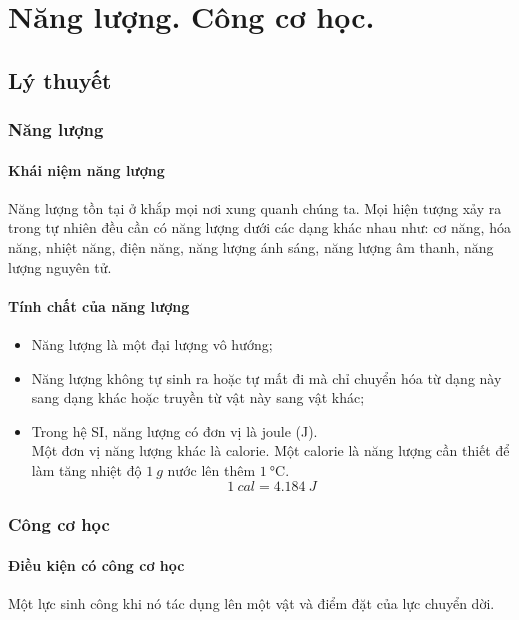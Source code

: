 \let\lesson\undefined
\newcommand{\lesson}{\phantomlesson{Bài 15: Năng lượng và công}}
\chapter[Năng lượng. Công cơ học.]{Năng lượng. Công cơ học.}
\setcounter{section}{0}
\section{Lý thuyết}
\subsection{Năng lượng}
\subsubsection{Khái niệm năng lượng}
Năng lượng tồn tại ở khắp mọi nơi xung quanh chúng ta. Mọi hiện tượng xảy ra trong tự nhiên đều cần có năng lượng dưới các dạng khác nhau như: cơ năng, hóa năng, nhiệt năng, điện năng, năng lượng ánh sáng, năng lượng âm thanh, năng lượng nguyên tử.
\subsubsection{Tính chất của năng lượng}
\begin{itemize}
	\item Năng lượng là một đại lượng vô hướng;
	\item Năng lượng không tự sinh ra hoặc tự mất đi mà chỉ chuyển hóa từ dạng này sang dạng khác hoặc truyền từ vật này sang vật khác;
	\item Trong hệ SI, năng lượng có đơn vị là joule (J).\\ Một đơn vị năng lượng khác là calorie. Một calorie là năng lượng cần thiết để làm tăng nhiệt độ $\SI{1}{g}$ nước lên thêm $\SI{1}{\celsius}$.
	$$\SI{1}{cal} = \SI{4.184}{J}$$
\end{itemize}

\subsection{Công cơ học}
	
	\subsubsection{Điều kiện có công cơ học}
	Một lực sinh công khi nó tác dụng lên một vật và điểm đặt của lực chuyển dời.
	
